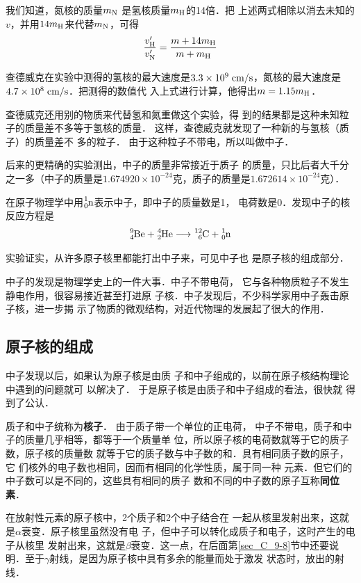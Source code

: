 我们知道，氮核的质量$m_{\rm N}$
是氢核质量$m_{\rm H}$的14倍．把
上述两式相除以消去未知的$v$，并用$14m_{\rm H}$来代替$m_{\rm N}$，可得
\[ \frac{v'_{\rm H}}{v'_{\rm N}} =\frac{m+14m_{\rm H}}{m+m_{\rm H}}\]

查德威克在实验中测得的氢核的最大速度是$3.3\times10^9 \;\text{cm}/\text{s} $，氮核的最大速度是$4.7\times10^8 \;\text{cm}/\text{s} $．把测得的数值代
入上式进行计算，他得出$m=1.15m_{\rm H}$．

查德威克还用别的物质来代替氢和氮重做这个实验，得
到的结果都是这种未知粒子的质量差不多等于氢核的质量．
这样，查德威克就发现了一种新的与氢核（质子）的质量差不
多的粒子．
由于这种粒子不带电，所以叫做中子．

后来的更精确的实验测出，中子的质量非常接近于质子
的质量，只比后者大千分之一多（中子的质量是$1.674920\times
10^{-24}$克，质子的质量是$1.672614\times10^{-24}$克）．

在原子物理学中用$\atom{n}{1}{0}$表示中子，即中子的质量数是1，
电荷数是0．发现中子的核反应方程是
\[\atom{Be}{9}{4}+\atom{He}{4}{2}\longrightarrow \atom{C}{12}{6}+\atom{n}{1}{0}  \]

实验证实，从许多原子核里都能打出中子来，可见中子也
是原子核的组成部分．

中子的发现是物理学史上的一件大事．中子不带电荷，
它与各种物质粒子不发生静电作用，很容易接近甚至打进原
子核．中子发现后，不少科学家用中子轰击原子核，进一步揭
示了物质的微观结构，对近代物理的发展起了很大的作用．

\subsection{原子核的组成}

中子发现以后，如果认为原子核是由质
子和中子组成的，以前在原子核结构理论中遇到的问题就可
以解决了．
于是原子核是由质子和中子组成的看法，很快就
得到了公认．

质子和中子统称为\textbf{核子}．
由于质子带一个单位的正电荷，
中子不带电，质子和中子的质量几乎相等，都等于一个质量单
位，所以原子核的电荷数就等于它的质子数，原子核的质量数
就等于它的质子数与中子数的和．具有相同质子数的原子，它
们核外的电子数也相同，因而有相同的化学性质，属于同一种
元素．但它们的中子数可以是不同的，这些具有相同的质子
数和不同的中子数的原子互称\textbf{同位素}．

在放射性元素的原子核中，2个质子和2个中子结合在
一起从核里发射出来，这就是$\alpha$衰变．原子核里虽然没有电
子，但中子可以转化成质子和电子，这时产生的电子从核里
发射出来，这就是$\beta$衰变．这一点，在后面第\ref{sec_C_9-8}节中还要说
明．至于$\gamma$射线，是因为原子核中具有多余的能量而处于激发
状态时，放出的射线．


